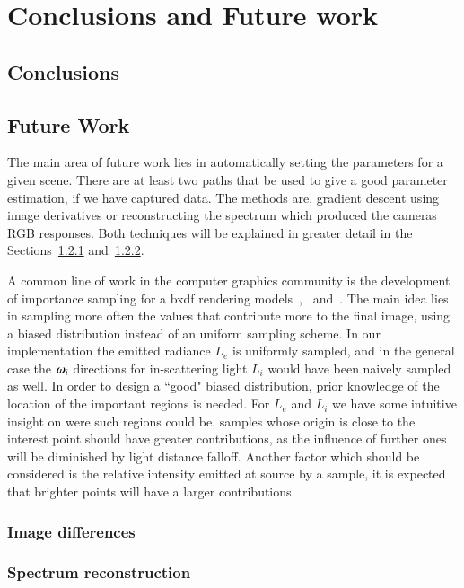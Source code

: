 \chapter{Conclusions and Future work}
\label{ch:conclusions}

\section{Conclusions}

\section{Future Work}

The main area of future work lies in automatically setting the parameters for a given scene.
There are at least two paths that be used to give a good parameter estimation, if we have captured data.
The methods are, gradient descent using image derivatives or reconstructing the spectrum which produced the cameras RGB responses.
Both techniques will be explained in greater detail in the Sections~\ref{sec:image_differences} and~\ref{sec:spectrum_reconstruction}.

A common line of work in the computer graphics community is the development of importance sampling for a bxdf rendering models~\cite{Lawrence:2004},~\cite{Ou:2012} and~\cite{Wang:2014}.
The main idea lies in sampling more often the values that contribute more to the final image, using a biased distribution instead of an uniform sampling scheme.
In our implementation the emitted radiance $L_e$ is uniformly sampled, and in the general case the $\boldsymbol{\omega}_i$ directions for in-scattering light $L_i$ would have been naively sampled as well.
In order to design a ``good" biased distribution, prior knowledge of the location of the important regions is needed. 
For $L_e$ and $L_i$ we have some intuitive insight on were such regions could be, samples whose origin is close to the interest point should have greater contributions, as the influence of further ones will be diminished by light distance falloff.
Another factor which should be considered is the relative intensity emitted at source by a sample, it is expected that brighter points will have a larger contributions. 

\subsection{Image differences}
\label{sec:image_differences}

\subsection{Spectrum reconstruction}
\label{sec:spectrum_reconstruction}

